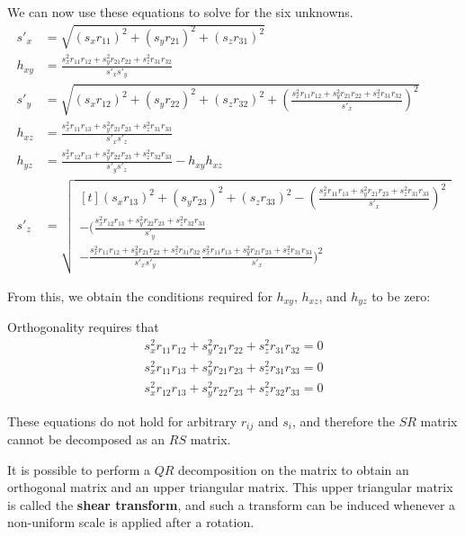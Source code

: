 \documentclass{article}
\begin{document}
We can now use these equations to solve for the six unknowns.
\begin{align}
s'_x &= \sqrt{(s_x r_{11})^2 + (s_y r_{21})^2 + (s_z r_{31})^2}\\
h_{xy} &= \frac{s_x^2 r_{11}r_{12} + s_y^2 r_{21}r_{22} + s_z^2 r_{31}r_{32}}{s'_x s'_y}\\
s'_y &= \sqrt{(s_x r_{12})^2 + (s_y r_{22})^2 + (s_z r_{32})^2 + \left(\frac{s_x^2 r_{11}r_{12} + s_y^2 r_{21}r_{22} + s_z^2 r_{31}r_{32}}{s'_x}\right)^2}\\
h_{xz} &= \frac{s_x^2 r_{11}r_{13} + s_y^2 r_{21}r_{23} + s_z^2 r_{31}r_{33}}{s'_x s'_z}\\
h_{yz} &= \frac{s_x^2 r_{12}r_{13} + s_y^2 r_{22}r_{23} + s_z^2 r_{32}r_{33}}{s'_y s'_z} - h_{xy}h_{xz}\\
s'_z &= \sqrt{\begin{multlined}[t]
(s_x r_{13})^2 + (s_y r_{23})^2 + (s_z r_{33})^2 - \left( \frac{s_x^2 r_{11}r_{13} + s_y^2 r_{21}r_{23} + s_z^2 r_{31}r_{33}}{s'_x}\right)^2\\
- \Bigg( \frac{s_x^2 r_{12}r_{13} + s_y^2 r_{22}r_{23} + s_z^2 r_{32}r_{33}}{s'_y} \\
- \frac{s_x^2 r_{11}r_{12} + s_y^2 r_{21}r_{22} + s_z^2 r_{31}r_{32}}{s'_x s'_y} \frac{s_x^2 r_{11}r_{13} + s_y^2 r_{21}r_{23} + s_z^2 r_{31}r_{33}}{s'_x}
\Bigg)^2
\end{multlined}}
\end{align}

From this, we obtain the conditions required for $h_{xy}$, $h_{xz}$, and $h_{yz}$ to be zero:

\fi

Orthogonality requires that
\begin{align}
{s_x^2 r_{11}r_{12} + s_y^2 r_{21}r_{22} + s_z^2 r_{31}r_{32}} = 0\\
{s_x^2 r_{11}r_{13} + s_y^2 r_{21}r_{23} + s_z^2 r_{31}r_{33}} = 0\\
{s_x^2 r_{12}r_{13} + s_y^2 r_{22}r_{23} + s_z^2 r_{32}r_{33}} = 0
\end{align}

These equations do not hold for arbitrary $r_{ij}$ and $s_i$, and therefore the $SR$ matrix cannot be decomposed as an $RS$ matrix.

It is possible to perform a $QR$ decomposition on the matrix to obtain an orthogonal matrix and an upper triangular matrix. This upper triangular matrix is called the \textbf{shear transform}, and such a transform can be induced whenever a non-uniform scale is applied after a rotation.\\
\end{document}
